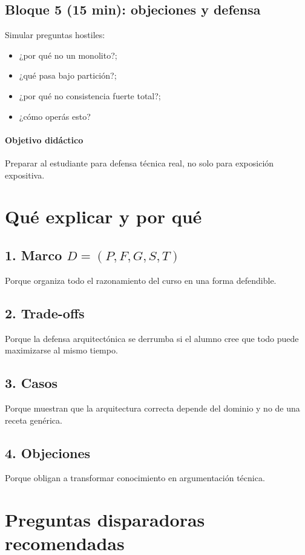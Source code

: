\documentclass[variant=docente,cover=institutional,mode=screen]{ua-engineering-v6-article}
\begin{document}
\subsection*{Bloque 5 (15 min): objeciones y defensa}
Simular preguntas hostiles:
\begin{itemize}
\item ¿por qué no un monolito?;
\item ¿qué pasa bajo partición?;
\item ¿por qué no consistencia fuerte total?;
\item ¿cómo operás esto?
\end{itemize}

\paragraph{Objetivo didáctico}
Preparar al estudiante para defensa técnica real, no solo para exposición expositiva.


\section{Qué explicar y por qué}

\subsection*{1. Marco $D=(P,F,G,S,T)$}
Porque organiza todo el razonamiento del curso en una forma defendible.

\subsection*{2. Trade-offs}
Porque la defensa arquitectónica se derrumba si el alumno cree que todo puede maximizarse al mismo tiempo.

\subsection*{3. Casos}
Porque muestran que la arquitectura correcta depende del dominio y no de una receta genérica.

\subsection*{4. Objeciones}
Porque obligan a transformar conocimiento en argumentación técnica.

\section{Preguntas disparadoras recomendadas}
\end{document}
